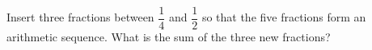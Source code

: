 Insert three fractions between $\dfrac{1}{4}$ and $\dfrac{1}{2}$ so that the five fractions form an arithmetic sequence. What is the sum of the three new fractions?
